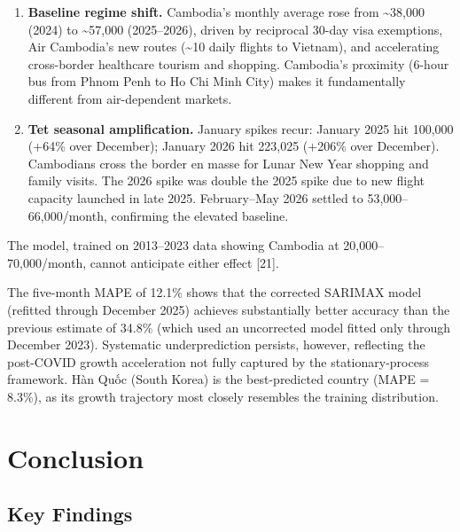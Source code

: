 \documentclass[
]{article}
\begin{document}
\begin{enumerate}
\def\labelenumi{\arabic{enumi}.}
\item
  \textbf{Baseline regime shift.} Cambodia's monthly average rose from
  \textasciitilde38,000 (2024) to \textasciitilde57,000 (2025--2026),
  driven by reciprocal 30-day visa exemptions, Air Cambodia's new routes
  (\textasciitilde10 daily flights to Vietnam), and accelerating
  cross-border healthcare tourism and shopping. Cambodia's proximity
  (6-hour bus from Phnom Penh to Ho Chi Minh City) makes it
  fundamentally different from air-dependent markets.
\item
  \textbf{Tet seasonal amplification.} January spikes recur: January
  2025 hit 100,000 (+64\% over December); January 2026 hit 223,025
  (+206\% over December). Cambodians cross the border en masse for Lunar
  New Year shopping and family visits. The 2026 spike was double the
  2025 spike due to new flight capacity launched in late 2025.
  February--May 2026 settled to 53,000--66,000/month, confirming the
  elevated baseline.
\end{enumerate}

The model, trained on 2013--2023 data showing Cambodia at
20,000--70,000/month, cannot anticipate either effect {[}21{]}.

The five-month MAPE of 12.1\% shows that the corrected SARIMAX model
(refitted through December 2025) achieves substantially better accuracy
than the previous estimate of 34.8\% (which used an uncorrected model
fitted only through December 2023). Systematic underprediction persists,
however, reflecting the post-COVID growth acceleration not fully
captured by the stationary-process framework. Hàn Quốc (South Korea) is
the best-predicted country (MAPE = 8.3\%), as its growth trajectory most
closely resembles the training distribution.

\section{Conclusion}\label{conclusion}

\subsection{Key Findings}\label{key-findings}
\end{document}
